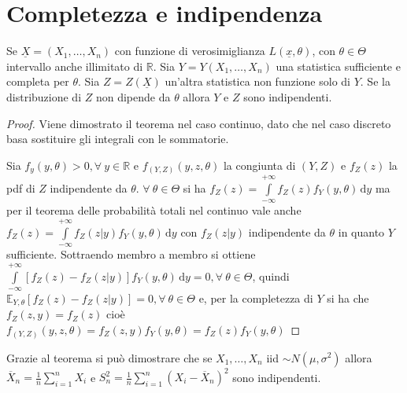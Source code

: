 \documentclass[hidelinks, 10pt]{report}
\begin{document}
\section{Completezza e indipendenza}
\begin{thm}
Se $ \underline{X} = (X_1, \dotsc, X_n) $ con funzione di verosimiglianza $ L(\underline{x}, \theta) $, con $ \theta \in \Theta $ intervallo anche illimitato di $ \mathbb{R} $. Sia $ Y = Y(X_1, \dotsc, X_n) $ una statistica sufficiente e completa per $ \theta $. Sia $ Z = Z(\underline{X}) $ un'altra statistica non funzione solo di $ Y $. Se la distribuzione di $ Z $ non dipende da $ \theta $ allora $ Y $ e $ Z $ sono indipendenti. 
\end{thm}

\begin{proof}
Viene dimostrato il teorema nel caso continuo, dato che nel caso discreto basa sostituire gli integrali con le sommatorie.

Sia $ f_{y}(y, \theta) > 0, \forall\ y \in \mathbb{R} $ e $ f_{(Y, Z)} (y, z, \theta) $ la congiunta di $ (Y, Z) $ e $ f_{Z} (z) $ la pdf di $ Z $ indipendente da $ \theta $. $ \forall\ \theta \in \Theta $ si ha $ f_{Z} (z) = \int\limits_{-\infty}^{+ \infty} f_{Z} (z) f_{Y} (y, \theta) \, \mathrm{d}y $ ma per il teorema delle probabilit\`a totali nel continuo vale anche $ f_{Z} (z) = \int\limits_{-\infty}^{+\infty} f_{Z}(z \vert y) f_{Y} (y, \theta) \, \mathrm{d}y $ con $ f_{Z}(z \vert y) $ indipendente da $ \theta $ in quanto $ Y $ sufficiente. Sottraendo membro a membro si ottiene $ \int\limits_{-\infty}^{+\infty} [f_{Z}(z) - f_{Z} (z \vert y)] f_{Y} (y, \theta) \, \mathrm{d}y = 0, \forall\ \theta \in \Theta $, quindi $ \mathbb{E}_{Y, \theta} [f_{Z}(z) - f_{Z} (z \vert y)] = 0, \forall\ \theta \in \Theta $ e, per la completezza di $ Y $ si ha che $ f_{Z}(z, y) = f_{Z} (z) $ cio\`e $ f_{(Y, Z)} (y, z, \theta) = f_{Z}(z, y) f_{Y}(y, \theta) = f_{Z}(z) f_{Y}(y, \theta) $
\end{proof}

\begin{oss}
Grazie al teorema si pu\`o dimostrare che se $ X_1, \dotsc, X_n $ iid $ \sim N(\mu, \sigma^2) $ allora $ \overline{X}_{n} = \frac{1}{n} \sum\limits_{i = 1}^{n} X_i $ e $ S^2_{n} = \frac{1}{n} \sum\limits_{i = 1}^{n} (X_i - \overline{X}_n)^2 $ sono indipendenti.
\end{oss}
\end{document}
